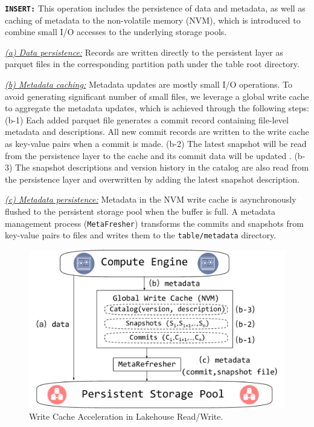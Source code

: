 \noindent \textbf{\texttt{INSERT:}} This operation includes the persistence of data and metadata, as well as caching of metadata to the non-volatile memory (NVM), which is introduced to combine small I/O accesses to the underlying storage pools.

\noindent \underline{\textit{(a) Data persistence:}} Records are written directly to the persistent layer as parquet files in the corresponding partition path under the table root directory.



\noindent \underline{\textit{(b) Metadata caching:}} Metadata updates are mostly small I/O operations. 
To avoid generating significant number of small files, we leverage a global write cache to aggregate the metadata updates, which is achieved through the following steps:
(b-1) Each added parquet file generates a commit record containing file-level metadata and descriptions. All new commit records are written to the write cache as key-value pairs when a commit is made.
(b-2) The latest snapshot will be read from the persistence layer to the cache and its commit data will be updated .
(b-3) The snapshot descriptions and version history in the catalog are also read from the persistence layer and  overwritten by adding the latest snapshot description. 

\noindent \underline{\textit{(c) Metadata persistence:}} Metadata in the NVM write cache is asynchronously flushed to the persistent storage pool when the buffer is full. A metadata management process (\texttt{MetaFresher}) transforms the commits and snapshots from key-value pairs to files and writes them to the \texttt{table/metadata} directory.

\begin{figure}[htbp]
	\includegraphics[scale=0.3]{figures/cache}
	\centering
	\vspace{-1em}
	\caption{Write Cache Acceleration in Lakehouse Read/Write.}
	\label{fig:cache}
	\vspace{-1em}
\end{figure}


